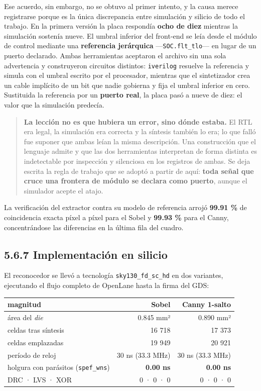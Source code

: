 Ese acuerdo, sin embargo, no se obtuvo al primer intento, y la causa
merece registrarse porque es la única discrepancia entre simulación y
silicio de todo el trabajo. En la primera versión la placa respondía
\textbf{ocho de diez} mientras la simulación sostenía nueve. El umbral
inferior del front-end se leía desde el módulo de control mediante una
\textbf{referencia jerárquica} ---\texttt{SOC.flt\_tlo}--- en lugar de
un puerto declarado. Ambas herramientas aceptaron el archivo sin una
sola advertencia y construyeron circuitos distintos: \texttt{iverilog}
resuelve la referencia y simula con el umbral escrito por el procesador,
mientras que el sintetizador crea un cable implícito de un bit que nadie
gobierna y fija el umbral inferior en cero. Sustituida la referencia por
un \textbf{puerto real}, la placa pasó a nueve de diez: el valor que la
simulación predecía.

\begin{quote}
\textbf{La lección no es que hubiera un error, sino dónde estaba.} El
RTL era legal, la simulación era correcta y la síntesis también lo era;
lo que falló fue suponer que ambas leían la misma descripción. Una
construcción que el lenguaje admite y que las dos herramientas
interpretan de forma distinta es indetectable por inspección y
silenciosa en los registros de ambas. Se deja escrita la regla de
trabajo que se adoptó a partir de aquí: \textbf{toda señal que cruce una
frontera de módulo se declara como puerto}, aunque el simulador acepte
el atajo.
\end{quote}

La verificación del extractor contra su modelo de referencia arrojó
\textbf{99.91 \%} de coincidencia exacta píxel a píxel para el Sobel y
\textbf{99.93 \%} para el Canny, concentrándose las diferencias en la
última fila del cuadro.

\subsection{5.6.7 Implementación en
silicio}\label{implementaciuxf3n-en-silicio}

El reconocedor se llevó a tecnología \texttt{sky130\_fd\_sc\_hd} en dos
variantes, ejecutando el flujo completo de OpenLane hasta la firma del
GDS:

\begin{longtable}[]{@{}lrr@{}}
\toprule\noalign{}
magnitud & Sobel & Canny 1-salto \\
\midrule\noalign{}
\endhead
\bottomrule\noalign{}
\endlastfoot
área del \emph{die} & 0.845 mm² & 0.890 mm² \\
celdas tras síntesis & 16 718 & 17 373 \\
celdas emplazadas & 19 949 & 20 921 \\
período de reloj & 30 ns (33.3 MHz) & 30 ns (33.3 MHz) \\
holgura con parásitos (\texttt{spef\_wns}) & \textbf{0.00 ns} &
\textbf{0.00 ns} \\
DRC · LVS · XOR & 0 · 0 · 0 & 0 · 0 · 0 \\
\end{longtable}

